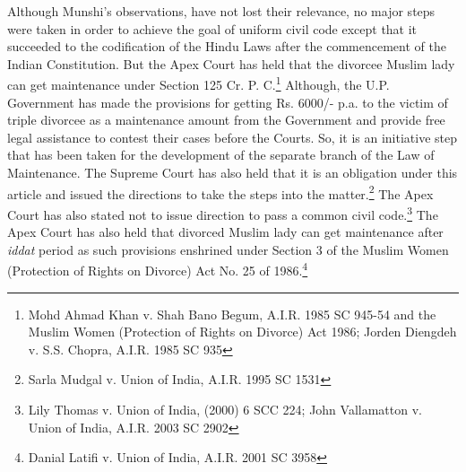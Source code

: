\begin{multicols}{2}
\noi
Although Munshi’s observations, have not lost their relevance, no major steps were taken in
order to achieve the goal of uniform civil code except that it succeeded to the codification of
the Hindu Laws after the commencement of the Indian Constitution. But the Apex Court has
held that the divorcee Muslim lady can get maintenance under Section 125 Cr. P. C.\footnote{ Mohd Ahmad Khan v. Shah Bano Begum, A.I.R. 1985 SC 945-54 and the Muslim Women (Protection of Rights on Divorce) Act 1986; Jorden Diengdeh v. S.S. Chopra, A.I.R. 1985 SC 935}
Although, the U.P. Government has made the provisions for getting Rs. 6000/- p.a. to the
victim of triple divorcee as a maintenance amount from the Government and provide free
legal assistance to contest their cases before the Courts. So, it is an initiative step that has
been taken for the development of the separate branch of the Law of Maintenance. The
Supreme Court has also held that it is an obligation under this article and issued the directions
to take the steps into the matter.\footnote{Sarla Mudgal v. Union of India, A.I.R. 1995 SC 1531} The Apex Court has also stated not to issue direction to
pass a common civil code.\footnote{ Lily Thomas v. Union of India, (2000) 6 SCC 224; John Vallamatton v. Union of India, A.I.R. 2003 SC
2902} The Apex Court has also held that divorced Muslim lady can get maintenance after {\it iddat} period as such provisions enshrined under Section 3 of the Muslim Women (Protection of Rights on Divorce) Act No. 25 of 1986.\footnote{Danial Latifi v. Union of India, A.I.R. 2001 SC 3958}



\end{multicols}
